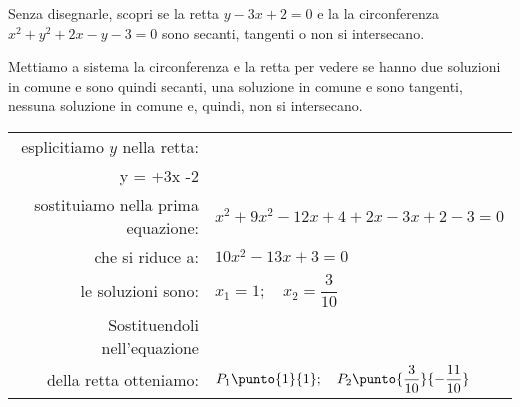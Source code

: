 \begin{esempio}
Senza disegnarle, scopri se la retta \(y -3x +2 = 0\) 
e la la circonferenza \(x^2 +y^2 +2x -y -3 = 0\) sono secanti, 
tangenti o non si intersecano.

Mettiamo a sistema la circonferenza  e la retta per vedere se hanno due 
soluzioni in comune e sono quindi secanti, una soluzione in comune e sono 
tangenti, nessuna soluzione in comune e, quindi, non si intersecano.
\begin{center} \begin{tabular}{rl}
esplicitiamo \(y\) nella retta: & 
\(\sistema{x^2 +y^2 +2x -y -3 = 0 \\ y = +3x -2}\) \\ [6pt]
sostituiamo nella prima equazione: &  
\(x^2 +9x^2 -12x +4 +2x -3x +2 -3 = 0\) \\
che si riduce a: &    
\(10x^2 -13x +3 = 0\) \\
le soluzioni sono: & 
\(x_1 = 1; \quad x_2 = \dfrac{3}{10}\) \\
Sostituendoli nell'equazione \\ della retta otteniamo: & 
\(P_1 \punto{1}{1}; \quad P_2 \punto{\dfrac{3}{10}}{-\dfrac{11}{10}}\)
\end{tabular} \end{center}
\end{esempio}

